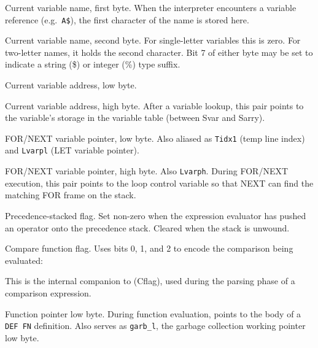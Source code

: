
Current variable name, first byte.  When the interpreter encounters a variable
reference (e.g.\ \texttt{A\$}), the first character of the name is stored here.


Current variable name, second byte.  For single-letter variables this is zero.
For two-letter names, it holds the second character.  Bit 7 of either byte may
be set to indicate a string (\$) or integer (\%) type suffix.


Current variable address, low byte.


Current variable address, high byte.  After a variable lookup, this pair
points to the variable's storage in the variable table (between Svar and
Sarry).


FOR/NEXT variable pointer, low byte.  Also aliased as \texttt{Tidx1} (temp
line index) and \texttt{Lvarpl} (LET variable pointer).


FOR/NEXT variable pointer, high byte.  Also \texttt{Lvarph}.  During FOR/NEXT
execution, this pair points to the loop control variable so that NEXT can
find the matching FOR frame on the stack.


Precedence-stacked flag.  Set non-zero when the expression evaluator has
pushed an operator onto the precedence stack.  Cleared when the stack is
unwound.


Compare function flag.  Uses bits 0, 1, and 2 to encode the comparison
being evaluated:

\bitfield{---}{---}{---}{---}{---}{\textgreater}{=}{\textless}

This is the internal companion to  (Cflag), used during the
parsing phase of a comparison expression.


Function pointer low byte.  During function evaluation, points to the body of
a \texttt{DEF FN} definition.  Also serves as \texttt{garb\_l}, the garbage
collection working pointer low byte.


